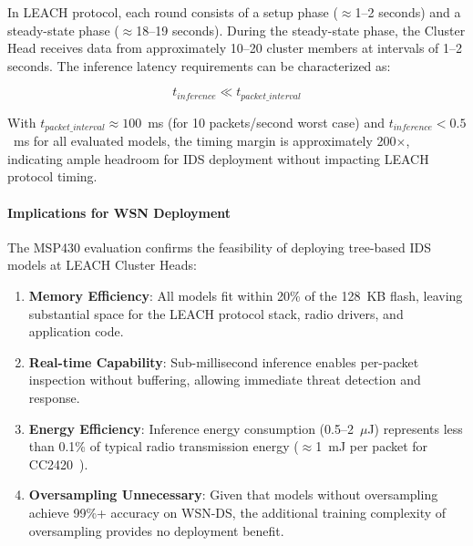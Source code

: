 In LEACH protocol, each round consists of a setup phase ($\approx$1--2 seconds) and a steady-state phase ($\approx$18--19 seconds). During the steady-state phase, the Cluster Head receives data from approximately 10--20 cluster members at intervals of 1--2 seconds. The inference latency requirements can be characterized as:

\begin{equation}
    t_{inference} \ll t_{packet\_interval}
\end{equation}

With $t_{packet\_interval} \approx 100$~ms (for 10 packets/second worst case) and $t_{inference} < 0.5$~ms for all evaluated models, the timing margin is approximately 200$\times$, indicating ample headroom for IDS deployment without impacting LEACH protocol timing.

\paragraph{Implications for WSN Deployment}

The MSP430 evaluation confirms the feasibility of deploying tree-based IDS models at LEACH Cluster Heads:

\begin{enumerate}
    \item \textbf{Memory Efficiency}: All models fit within 20\% of the 128~KB flash, leaving substantial space for the LEACH protocol stack, radio drivers, and application code.
    
    \item \textbf{Real-time Capability}: Sub-millisecond inference enables per-packet inspection without buffering, allowing immediate threat detection and response.
    
    \item \textbf{Energy Efficiency}: Inference energy consumption (0.5--2~$\mu$J) represents less than 0.1\% of typical radio transmission energy ($\approx$1~mJ per packet for CC2420~\cite{polastre2005versatile}).
    
    \item \textbf{Oversampling Unnecessary}: Given that models without oversampling achieve 99\%+ accuracy on WSN-DS, the additional training complexity of oversampling provides no deployment benefit.
\end{enumerate}
